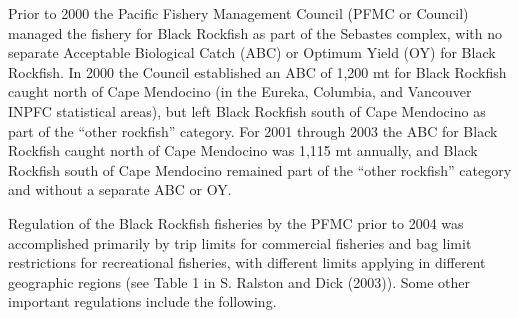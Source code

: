 \documentclass[11pt,
  english,
  letterpaper,
]{article}
\begin{document}
Prior to 2000 the Pacific Fishery Management Council (PFMC or Council) managed the fishery for Black Rockfish as part of the Sebastes complex, with no separate Acceptable Biological Catch (ABC) or Optimum Yield (OY) for Black Rockfish. In 2000 the Council established an ABC of 1,200 mt for Black Rockfish caught north of Cape Mendocino (in the Eureka, Columbia, and Vancouver INPFC statistical areas), but left Black Rockfish south of Cape Mendocino as part of the ``other rockfish'' category. For 2001 through 2003 the ABC for Black Rockfish caught north of Cape Mendocino was 1,115 mt annually, and Black Rockfish south of Cape Mendocino remained part of the ``other rockfish'' category and without a separate ABC or OY.

Regulation of the Black Rockfish fisheries by the PFMC prior to 2004 was accomplished primarily by trip limits for commercial fisheries and bag limit restrictions for recreational fisheries, with different limits applying in different geographic regions (see Table 1 in S. Ralston and Dick (2003)). Some other important regulations include the following.
\end{document}
